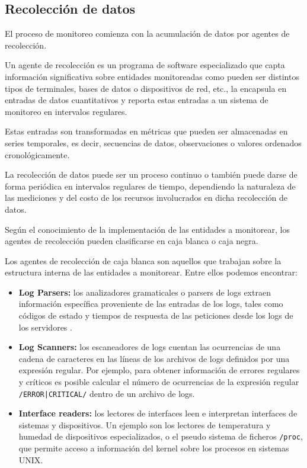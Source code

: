 \subsection{Recolección de datos}
\label{recoleccion_de_datos}
El proceso de monitoreo comienza con la acumulación de datos por agentes de
recolección.

Un agente de recolección es un programa de software especializado que capta
información significativa sobre entidades monitoreadas como pueden ser
distintos tipos de terminales, bases de datos o dispositivos de red, etc., la
encapsula en entradas de datos cuantitativos y reporta estas entradas a un
sistema de monitoreo en intervalos regulares.

Estas entradas son transformadas en métricas que pueden ser almacenadas en
series temporales, es decir, secuencias de datos, observaciones o valores
ordenados cronológicamente.

La recolección de datos puede ser un proceso continuo o también puede darse de
forma periódica en intervalos regulares de tiempo, dependiendo la naturaleza de
las mediciones y del costo de los recursos involucrados en dicha recolección de
datos.

Según el conocimiento de la implementación de las entidades a monitorear, los
agentes de recolección pueden clasificarse en caja blanca o caja negra.

Los agentes de recolección de caja blanca son aquellos que trabajan sobre la
estructura interna de las entidades a monitorear. Entre ellos podemos
encontrar:

\begin{itemize}
  \item \textbf{Log Parsers:} los analizadores gramaticales o parsers de logs
    extraen información específica proveniente de las entradas de los logs,
    tales como códigos de estado y tiempos de respuesta de las peticiones desde
    los logs de los servidores .

  \item \textbf{Log Scanners:} los escaneadores de logs cuentan las ocurrencias
    de una cadena de caracteres en las líneas de los archivos de logs definidos
    por una expresión regular. Por ejemplo, para obtener información de errores
    regulares y críticos es posible calcular el número de ocurrencias de la
    expresión regular \texttt{/ERROR|CRITICAL/} dentro de un archivo de logs.

  \item \textbf{Interface readers:} los lectores de interfaces leen e
    interpretan interfaces de sistemas y dispositivos. Un ejemplo son los
    lectores de temperatura y humedad de dispositivos especializados, o el
    pseudo sistema de ficheros \texttt{/proc}, que permite acceso a información del
    kernel sobre los procesos en sistemas UNIX.
\end{itemize}

